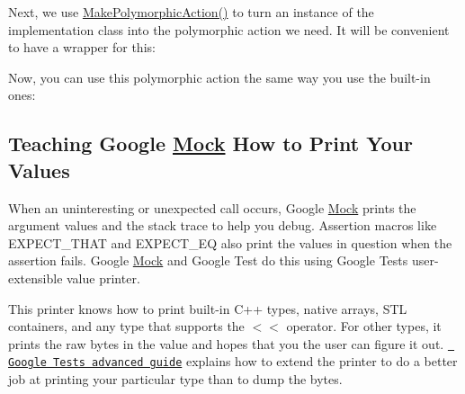 Next, we use {\ttfamily \mbox{\hyperlink{namespacetesting_a36bd06c5ea972c6df0bd9f40a7a94c65}{Make\+Polymorphic\+Action()}}} to turn an instance of the implementation class into the polymorphic action we need. It will be convenient to have a wrapper for this\+:


\begin{DoxyCode}{0}
\DoxyCodeLine{}
\DoxyCodeLine{\}}
\end{DoxyCode}


Now, you can use this polymorphic action the same way you use the built-\/in ones\+:


\begin{DoxyCode}{0}
\DoxyCodeLine{}
\DoxyCodeLine{\};}
\DoxyCodeLine{}
\end{DoxyCode}


\subsection*{Teaching Google \mbox{\hyperlink{classMock}{Mock}} How to Print Your Values}

When an uninteresting or unexpected call occurs, Google \mbox{\hyperlink{classMock}{Mock}} prints the argument values and the stack trace to help you debug. Assertion macros like {\ttfamily E\+X\+P\+E\+C\+T\+\_\+\+T\+H\+AT} and {\ttfamily E\+X\+P\+E\+C\+T\+\_\+\+EQ} also print the values in question when the assertion fails. Google \mbox{\hyperlink{classMock}{Mock}} and Google Test do this using Google Test\textquotesingle{}s user-\/extensible value printer.

This printer knows how to print built-\/in C++ types, native arrays, S\+TL containers, and any type that supports the {\ttfamily $<$$<$} operator. For other types, it prints the raw bytes in the value and hopes that you the user can figure it out. \href{../../googletest/docs/advanced.md\#teaching-google-test-how-to-print-your-values}{\texttt{ Google Test\textquotesingle{}s advanced guide}} explains how to extend the printer to do a better job at printing your particular type than to dump the bytes. 